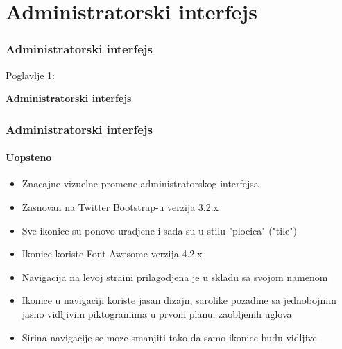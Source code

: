 %

\section{Administratorski interfejs}
\begin{frame}[fragile]
	\frametitle{Administratorski interfejs }

	\begin{center}\huge{Poglavlje 1:}\end{center}
	\begin{center}\huge{\color{typo3darkgrey}\textbf{Administratorski interfejs}}\end{center}

\end{frame}


\begin{frame}[fragile]
	\frametitle{Administratorski interfejs}
	\framesubtitle{Uopsteno}

	\begin{itemize}
		\item Znacajne vizuelne promene administratorskog interfejsa
		\item Zasnovan na Twitter Bootstrap-u verzija 3.2.x
		\item Sve ikonice su ponovo uradjene i sada su u stilu "plocica" ("tile")
		\item Ikonice koriste Font Awesome verzija 4.2.x
		\item Navigacija na levoj straini prilagodjena je u skladu sa svojom namenom
		\item Ikonice u navigaciji koriste jasan dizajn, sarolike pozadine sa jednobojnim jasno vidljivim piktogramima u prvom planu, zaobljenih uglova
		\item Sirina navigacije se moze smanjiti tako da samo ikonice budu vidljive

	\end{itemize}

\end{frame}

